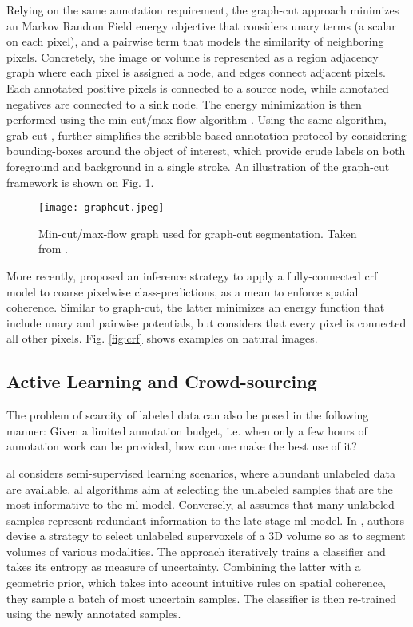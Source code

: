 Relying on the same annotation requirement, the graph-cut approach \cite{Boykov2006}
minimizes an Markov Random Field energy objective that considers unary terms (a scalar on each pixel), and a pairwise term that models the similarity of neighboring pixels.
Concretely, the image or volume is represented as a region adjacency graph where each pixel is assigned a node, and edges connect adjacent pixels.
Each annotated positive pixels is connected to a source node, while annotated negatives are connected to a sink node.
The energy minimization is then performed using the min-cut/max-flow algorithm \cite{goldberg88}.
Using the same algorithm, grab-cut \cite{rother04}, further simplifies the scribble-based annotation protocol by considering bounding-boxes around the object of interest, which provide crude labels on both foreground and background in a single stroke.
An illustration of the graph-cut framework is shown on Fig. \ref{fig:graphcut}.

\begin{figure}[!h]
  \centering
  \texttt{[image: graphcut.jpeg]}
  \caption{Min-cut/max-flow graph used for graph-cut segmentation. Taken from \cite{xiao17}.}
  \label{fig:graphcut}
\end{figure}

More recently, \cite{krahenbuhl11} proposed an inference strategy to apply a fully-connected \gls{crf} model to coarse pixelwise class-predictions, as a mean to enforce spatial coherence.
Similar to graph-cut, the latter minimizes an energy function that include unary and pairwise potentials, but considers that every pixel is connected all other pixels.
Fig. \ref{fig:crf} shows examples on natural images.

\subsection{Active Learning and Crowd-sourcing}
The problem of scarcity of labeled data can also be posed in the following manner:
Given a limited annotation budget, i.e. when only a few hours of annotation work can be provided, how can one make the best use of it?

\gls{al} \cite{settles09} considers semi-supervised learning scenarios, where abundant unlabeled data are available.
\gls{al} algorithms aim at selecting the unlabeled samples that are the most informative to the \gls{ml} model.
Conversely, \gls{al} assumes that many unlabeled samples represent redundant information to the late-stage \gls{ml} model.
In \cite{KonSznFua15}, authors devise a strategy to select unlabeled supervoxels of a 3D volume so as to segment volumes of various modalities.
The approach iteratively trains a classifier and takes its entropy as measure of uncertainty.
Combining the latter with a geometric prior, which takes into account intuitive rules on spatial coherence, they sample a batch of most uncertain samples.
The classifier is then re-trained using the newly annotated samples.

